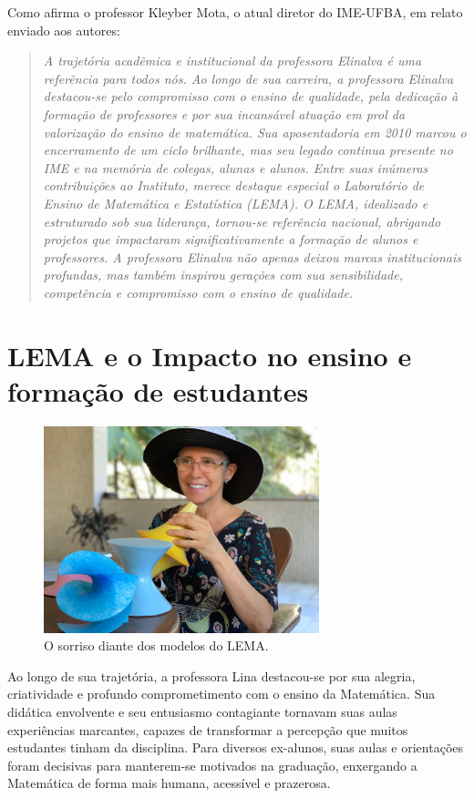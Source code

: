 \documentclass{hipatia}
\begin{document}
Como afirma o professor Kleyber Mota, o atual diretor do IME-UFBA, em relato enviado aos autores: \begin{quote}
   \textit{A trajetória acadêmica e institucional da professora Elinalva é uma referência para todos nós. Ao longo de sua carreira, a professora Elinalva destacou-se pelo compromisso com o ensino de qualidade, pela dedicação à formação de professores e por sua incansável atuação em prol da valorização do ensino de matemática. Sua aposentadoria em 2010 marcou o encerramento de um ciclo brilhante, mas seu legado continua presente no IME e na memória de colegas, alunas e alunos.
Entre suas inúmeras contribuições ao Instituto, merece destaque especial o Laboratório de Ensino de Matemática e Estatística (LEMA). O LEMA, idealizado e estruturado sob sua liderança, tornou-se referência nacional, abrigando projetos que impactaram significativamente a formação de alunos e professores. A professora Elinalva não apenas deixou marcas institucionais profundas, mas também inspirou gerações com sua sensibilidade, competência e compromisso com o ensino de qualidade.} 
\end{quote}


\section{LEMA e o Impacto no ensino e formação de estudantes}

\begin{figure}[htb!]
\includegraphics[width=8cm]{LEMA1.jpeg}
\caption{O sorriso diante dos modelos do LEMA.}   
\end{figure}


Ao longo de sua trajetória, a professora Lina destacou-se por sua alegria, criatividade e profundo comprometimento com o ensino da Matemática. Sua didática envolvente e seu entusiasmo contagiante tornavam suas aulas experiências marcantes, capazes de transformar a percepção que muitos estudantes tinham da disciplina. Para diversos ex-alunos, suas aulas e orientações foram decisivas para manterem-se motivados na graduação, enxergando a Matemática de forma mais humana, acessível e prazerosa.  
\end{document}
